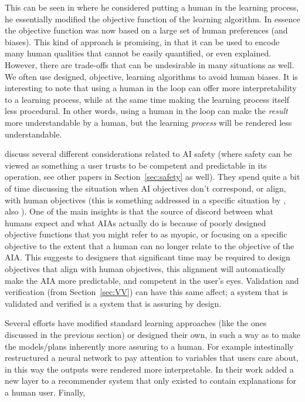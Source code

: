     This can be seen in \citet{Freitas2006-qo} where he considered putting a human in the learning process, he essentially modified the objective function of the learning algorithm. In essence the objective function was now based on a large set of human preferences (and biases). This kind of approach is promising, in that it can be used to encode many human qualities that cannot be easily quantified, or even explained. However, there are trade-offs that can be undesirable in many situations as well. We often use designed, objective, learning algorithms to avoid human biases. It is interesting to note that using a human in the loop can offer more interpretability to a learning process, while at the same time making the learning process itself less procedural. In other words, using a human in the loop can make the \emph{result} more understandable by a human, but the learning \emph{process} will be rendered less understandable.

    \citet{Amodei2016-xi} discuss several different considerations related to AI safety (where safety can be viewed as something a user trusts to be competent and predictable in its operation, see other papers in Section~\ref{sec:safety} as well). They spend quite a bit of time discussing the situation when AI objectives don't correspond, or align, with human objectives (this is something addressed in a specific situation by \cite{Hadfield-Menell2016-ws}, also \cite{Bostrom2012-uf}). One of the main insights is that the source of discord between what humans expect and what AIAs actually do is because of poorly designed objective functions that you might refer to as myopic, or focusing on a specific objective to the extent that a human can no longer relate to the objective of the AIA. This suggests to designers that significant time may be required to design objectives that align with human objectives, this alignment will automatically make the AIA more predictable, and competent in the user's eyes. Validation and verification (from Section~\ref{sec:VV}) can have this same affect; a system that is validated and verified is a system that is assuring by design.

    Several efforts have modified standard learning approaches (like the ones discussed in the previous section) or designed their own, in such a way as to make the models/plans inherently more assuring to a human. For example \cite{Choi2016-by} intestinally restructured a neural network to pay attention to variables that users care about, in this way the outputs were rendered more interpretable. In their work \cite{Abdollahi2016-vn} added a new layer to a recommender system that only existed to contain explanations for a human user. Finally, \cite{Jovanovic2016-gw,Swartout1983-ko} 

